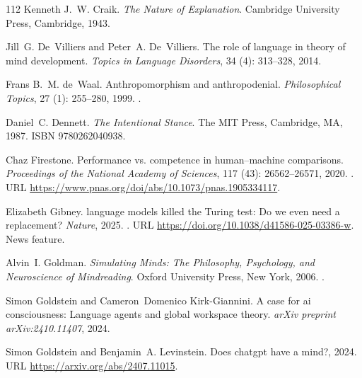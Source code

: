 \begin{thebibliography}{112}
Kenneth J.~W. Craik.
\newblock \emph{The Nature of Explanation}.
\newblock Cambridge University Press, Cambridge, 1943.

Jill~G. De~Villiers and Peter~A. De~Villiers.
\newblock The role of language in theory of mind development.
\newblock \emph{Topics in Language Disorders}, 34 (4): 313--328, 2014.

Frans B.~M. de~Waal.
\newblock Anthropomorphism and anthropodenial.
\newblock \emph{Philosophical Topics}, 27 (1): 255--280, 1999.
\newblock {}.

Daniel~C. Dennett.
\newblock \emph{The Intentional Stance}.
\newblock The MIT Press, Cambridge, MA, 1987.
\newblock ISBN 9780262040938.

Chaz Firestone.
\newblock Performance vs. competence in human–machine comparisons.
\newblock \emph{Proceedings of the National Academy of Sciences}, 117 (43): 26562--26571, 2020.
\newblock {}.
\newblock URL \url{https://www.pnas.org/doi/abs/10.1073/pnas.1905334117}.

Elizabeth Gibney.
 language models killed the {Turing} test: Do we even need a replacement?
\newblock \emph{Nature}, 2025.
\newblock {}.
\newblock URL \url{https://doi.org/10.1038/d41586-025-03386-w}.
\newblock News feature.

Alvin~I. Goldman.
\newblock \emph{Simulating Minds: The Philosophy, Psychology, and Neuroscience of Mindreading}.
\newblock Oxford University Press, New York, 2006.
\newblock {}.

Simon Goldstein and Cameron~Domenico Kirk-Giannini.
\newblock A case for ai consciousness: Language agents and global workspace theory.
\newblock \emph{arXiv preprint arXiv:2410.11407}, 2024.

Simon Goldstein and Benjamin~A. Levinstein.
\newblock Does chatgpt have a mind?, 2024.
\newblock URL \url{https://arxiv.org/abs/2407.11015}.


\end{thebibliography}

